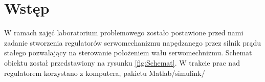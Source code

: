 \chapter{Wstęp}
\label{cha:Wstep}

W ramach zajęć laboratorium problemowego zostało postawione przed nami zadanie stworzenia regulatorów serwomechanizmu napędzanego przez silnik prądu stałego pozwalający na sterowanie położeniem wału serwomechnizmu. %
Schemat obiektu został przedstawiony na rysunku \ref{fig:Schemat}. W trakcie prac nad regulatorem korzystano z komputera, pakietu Matlab/simulink/










